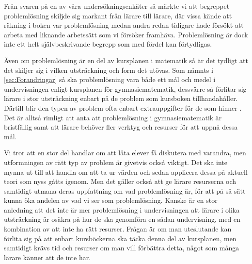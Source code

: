 \textcolor{Mahogany}{Från svaren på en av våra undersökningsenkäter så märkte vi att begreppet problemlösning skiljde sig markant från lärare till lärare, där vissa kände att räkning i boken var problemlösning medan andra redan tidigare hade försökt att arbeta med liknande arbetssätt som vi försöker framhäva. Problemlösning är dock inte ett helt självbeskrivande begrepp som med fördel kan förtydligas.}

\textcolor{Mahogany}{Även om problemlösning är en del av kursplanen i matematik så är det tydligt att det skiljer sig i vilken utsträckning och form det utövas. Som nämnts i \ref{sec:Forandringar} så ska problemlösning vara både ett mål och medel i undervisningen enligt kursplanen för gymnasiematematik, dessvärre så förlitar sig lärare i stor utsträckning enbart på de problem som kursboken tillhandahåller. Därtill blir den typen av problem ofta enbart extrauppgifter för de som hinner \cite{2010UndervisningenGymnasieskolan}. Det är alltså rimligt att anta att problemlösning i gymnasiematematik är bristfällig samt att lärare behöver fler verktyg och resurser för att uppnå dessa mål.}

\textcolor{Mahogany}{Vi tror att en stor del handlar om att låta elever få diskutera med varandra, men utformningen av rätt typ av problem är givetvis också viktigt. Det ska inte mynna ut till att handla om att ta ur värden och sedan applicera dessa på aktuell teori som nyss gåtts igenom. Men det gäller också att ge lärare resurserna och samtidigt utmana deras uppfattning om vad problemlösning är, för att på så sätt kunna öka andelen av vad vi ser som problemlösning.
Kanske är en stor anledning att det inte är mer problemlösning i undervisningen att lärare i olika utsträckning är osäkra på hur de ska genomföra en sådan undervisning, med en kombination av att inte ha rätt resurser. Frågan är om man uteslutande kan förlita sig på att enbart kursböckerna ska täcka denna del av kursplanen, men samtidigt krävs tid och resurser om man vill förbättra detta, något som många lärare känner att de inte har.}